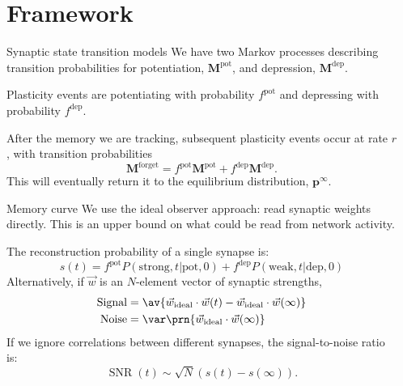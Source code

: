 \documentclass[final,hyperref={pdfpagelabels=false,bookmarks=false}]{beamer}
\DeclareMathOperator{\SNR}{SNR}
\newcommand{\pot}{^\text{pot}}
\newcommand{\dep}{^\text{dep}}
\newcommand{\frg}{^\text{forget}}
\newcommand{\eq}{\mathbf{p}^\infty}
\newcommand{\W}{\vec{w}}
\newcommand{\M}{\mathbf{M}}
\begin{document}
\begin{frame}{}
\begin{columns}[t]
\begin{column}{0.27\linewidth}
\end{column}

\begin{column}{0.37\linewidth}

\section{Framework}


\begin{block}{Synaptic state transition models}
%
%
 We have two Markov processes describing transition probabilities for potentiation, $\M\pot$, and depression, $\M\dep$.

 \vp Plasticity events are potentiating with probability $f\pot$ and depressing with probability $f\dep$.

 \vp After the memory we are tracking, subsequent plasticity events occur at rate $r$, with transition probabilities
 \begin{equation*}
   \M\frg = f\pot\M\pot + f\dep\M\dep.
 \end{equation*}
 This will eventually return it to the equilibrium distribution, $\eq$.
%
\end{block}


\begin{block}{Memory curve}
%
 We use the ideal observer approach: read synaptic weights directly.
 This is an upper bound on what could be read from network activity.

 The reconstruction probability of a single synapse is:
 \begin{equation*}
   s(t) = f\pot P(\text{strong},t|\text{pot},0) + f\dep P(\text{weak},t|\text{dep},0)
 \end{equation*}
 Alternatively, if $\W$ is an $N$-element vector of synaptic strengths,
 \begin{equation*}
   \begin{aligned}
     \text{Signal} &= \av{\W_\text{ideal} \cdot \W(t) -  \W_\text{ideal} \cdot \W(\infty)}\\
     \text{Noise} &= \var\prn{\W_\text{ideal} \cdot \W(\infty)}
   \end{aligned}
 \end{equation*}
 If we ignore correlations between different synapses, the signal-to-noise ratio is:
 \begin{equation*}
   \SNR(t) \sim \sqrt{N}(s(t)-s(\infty)).
 \end{equation*}
%
\end{block}



\end{column}
\end{columns}
\end{frame}
\end{document}
